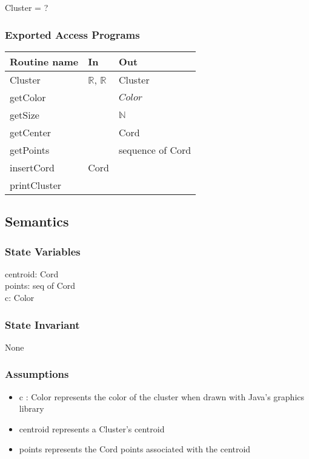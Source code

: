 \documentclass[12pt]{article}
\begin{document}
Cluster = ?

\subsubsection* {Exported Access Programs}

\begin{tabular}{| l | l | l |}
\hline
\textbf{Routine name} & \textbf{In} & \textbf{Out}\\
\hline
Cluster & $\mathbb{R}$, $\mathbb{R}$ & Cluster\\
\hline
getColor & ~ & $Color$\\
\hline
getSize & ~ & $\mathbb{N}$\\
\hline
getCenter & ~ & Cord \\
\hline
getPoints & ~ & sequence of Cord\\
\hline
insertCord & Cord & ~ \\
\hline
printCluster & ~ & ~ \\
\hline
\end{tabular}

\subsection* {Semantics}

\subsubsection* {State Variables}
centroid: Cord\\
points: seq of Cord\\
c: Color

\subsubsection* {State Invariant}

None

\subsubsection* {Assumptions}
\begin{itemize}
\item c : Color represents the color of the cluster when drawn with Java's graphics
library
\item centroid represents a Cluster's centroid
\item points represents the Cord points associated with the centroid
\end{itemize}
\end{document}
